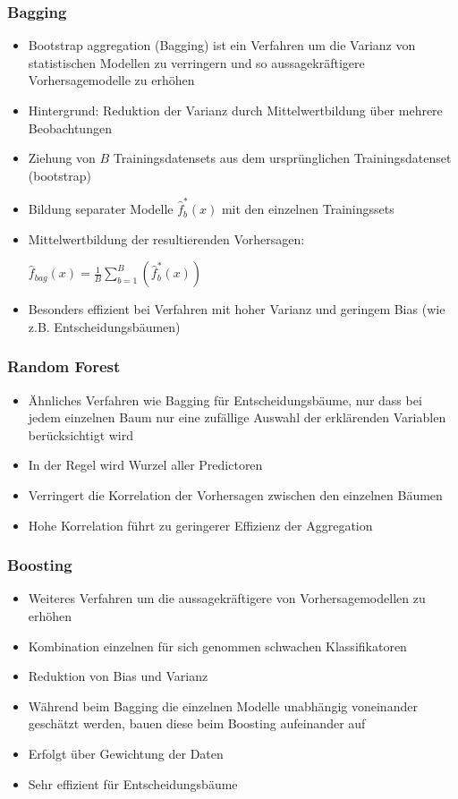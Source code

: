\documentclass{beamer}
\begin{document}
\begin{frame}
  \frametitle{Bagging}  
  \begin{itemize}
  \item Bootstrap aggregation (Bagging) ist ein Verfahren um die Varianz von statistischen Modellen zu verringern und so aussagekräftigere Vorhersagemodelle zu erhöhen
  \item Hintergrund: Reduktion der Varianz durch Mittelwertbildung über mehrere Beobachtungen
  \item Ziehung von $B$ Trainingsdatensets aus dem ursprünglichen Trainingsdatenset (bootstrap)
  \item Bildung separater Modelle $\hat{f}^\ast_{b}(x)$ mit den einzelnen Trainingssets
  \item Mittelwertbildung der resultierenden Vorhersagen:
  \newline
\begin{center}
      $\hat{f}_{bag}(x)=\frac{1}{B}\sum\limits_{b=1}^{B}(\hat{f}^\ast_{b}(x))$
  \end{center}  
  \item Besonders effizient bei Verfahren mit hoher Varianz und geringem Bias (wie z.B. Entscheidungsbäumen)
  \end{itemize}  
\end{frame}

\begin{frame}
  \frametitle{Random Forest}  
  \begin{itemize}
  \item Ähnliches Verfahren wie Bagging für Entscheidungsbäume, nur dass bei jedem einzelnen Baum nur eine zufällige Auswahl der erklärenden Variablen berücksichtigt wird
  \item In der Regel wird Wurzel aller Predictoren
  \item Verringert die Korrelation der Vorhersagen zwischen den einzelnen Bäumen
  \item Hohe Korrelation führt zu geringerer Effizienz der Aggregation 
  \end{itemize}  
\end{frame}

\begin{frame}
  \frametitle{Boosting}  
  \begin{itemize}
  \item Weiteres Verfahren um die aussagekräftigere von Vorhersagemodellen zu erhöhen
  \item Kombination einzelnen für sich genommen schwachen Klassifikatoren
  \item Reduktion von Bias und Varianz
  \item Während beim Bagging die einzelnen Modelle unabhängig voneinander geschätzt werden, bauen diese beim Boosting aufeinander auf
  \item Erfolgt über Gewichtung der Daten
  \item Sehr effizient für Entscheidungsbäume
  \end{itemize}  
\end{frame}
\end{document}
